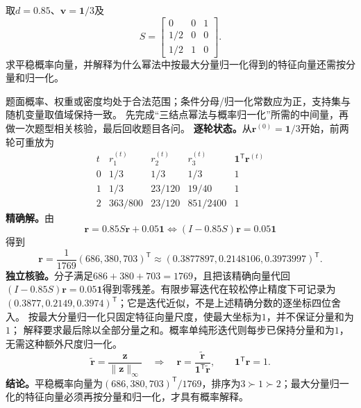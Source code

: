 \begin{example}[三结点幂法与概率归一化]\label{exm:V5-C07-power-three}
取$d=0.85$、$\boldsymbol v=\boldsymbol1/3$及
\[
S=\begin{bmatrix}0&0&1\\1/2&0&0\\1/2&1&0\end{bmatrix}.
\]
求平稳概率向量，并解释为什么幂法中按最大分量归一化得到的特征向量还需按分量和归一化。
\end{example}
\begin{solution}
\SolGiven 题面概率、权重或密度均处于合法范围；条件分母/归一化常数应为正，支持集与随机变量取值域保持一致。
\SolPlan 先完成“三结点幂法与概率归一化”所需的中间量，再做一次题型相关核验，最后回收题目各问。
\SolDerive
\textbf{逐轮状态。}从$\boldsymbol r^{(0)}=\boldsymbol1/3$开始，前两轮可重放为
\[
\begin{array}{c|ccc|c}
t&r_1^{(t)}&r_2^{(t)}&r_3^{(t)}&\boldsymbol1^{\mathsf T}\boldsymbol r^{(t)}\\\hline
0&1/3&1/3&1/3&1\\
1&1/3&23/120&19/40&1\\
2&363/800&23/120&851/2400&1
\end{array}
\]
\textbf{精确解。}由
\[
\boldsymbol r=0.85S\boldsymbol r+0.05\boldsymbol1
\Longleftrightarrow
(I-0.85S)\boldsymbol r=0.05\boldsymbol1
\]
得到
\[
\boldsymbol r=\frac1{1769}(686,380,703)^{\mathsf T}
\approx(0.3877897,0.2148106,0.3973997)^{\mathsf T}.
\]
\textbf{独立核验。}分子满足$686+380+703=1769$，且把该精确向量代回
$(I-0.85S)\boldsymbol r=0.05\boldsymbol1$得到零残差。有限步幂迭代在较松停止精度下可记录为
$(0.3877,0.2149,0.3974)^{\mathsf T}$；它是迭代近似，不是上述精确分数的逐坐标四位舍入。
按最大分量归一化只固定特征向量尺度，使最大坐标为$1$，并不保证分量和为$1$；
\PageRank{}解释要求最后除以全部分量之和。概率单纯形迭代则每步已保持分量和为$1$，无需这种额外尺度归一化。
\[
\widetilde{\boldsymbol r}=\frac{\boldsymbol z}{\|\boldsymbol z\|_\infty}
\quad\Longrightarrow\quad
\boldsymbol r=\frac{\widetilde{\boldsymbol r}}
{\boldsymbol1^{\mathsf T}\widetilde{\boldsymbol r}},
\qquad \boldsymbol1^{\mathsf T}\boldsymbol r=1.
\]
\textbf{结论。}平稳概率向量为$(686,380,703)^{\mathsf T}/1769$，排序为$3\succ1\succ2$；最大分量归一化的特征向量必须再按分量和归一化，才具有概率解释。
\end{solution}

